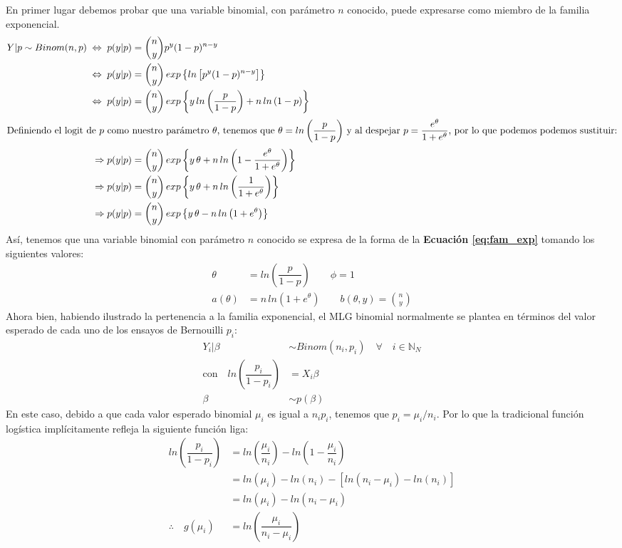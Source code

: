 En primer lugar debemos probar que una variable binomial, con parámetro $n$ conocido, puede expresarse como miembro de la familia exponencial. 
\begin{align} \label{eq:Binom_Fam_Exp}
Y|p \sim Binom(n,p) \;\Leftrightarrow\; p(y|p) &= {n\choose y}p^y(1-p)^{n-y} \nonumber \\
 \;\Leftrightarrow\; p(y|p) &= {n\choose y}\,exp\left\lbrace ln\left[p^y(1-p)^{n-y}\right]\right\rbrace \nonumber \\
 \;\Leftrightarrow\; p(y|p) &= {n\choose y}\,exp\left\lbrace y\,ln\left(\dfrac{p}{1-p}\right)+n\,ln\left(1-p\right)\right\rbrace \nonumber \\
\intertext{Definiendo el logit de $p$ como nuestro parámetro $\theta$, tenemos que $\theta = ln\left(\dfrac{p}{1-p}\right)$ y al despejar $p = \dfrac{e^\theta}{1+e^\theta}$, por lo que podemos podemos sustituir:} \nonumber
\Rightarrow p(y|p) &= {n\choose y}\,exp\left\lbrace y\,\theta+n\,ln\left(1-\dfrac{e^\theta}{1+e^\theta}\right)\right\rbrace \nonumber \\
\Rightarrow p(y|p) &= {n\choose y}\,exp\left\lbrace y\,\theta+n\,ln\left(\dfrac{1}{1+e^\theta}\right)\right\rbrace \nonumber \\
\Rightarrow p(y|p) &= {n\choose y}\,exp\left\lbrace y\,\theta-n\,ln\left(1+e^\theta\right)\right\rbrace
\end{align} 
Así, tenemos que una variable binomial con parámetro $n$ conocido se expresa de la forma de la \textbf{Ecuación \ref{eq:fam_exp}} tomando los siguientes valores: 
\begin{align*}
\theta &= ln\left(\dfrac{p}{1-p}\right) \qquad \phi = 1\\
a(\theta) &= n\,ln\left(1+e^\theta\right) \qquad b(\theta,y) = {n\choose y}
\end{align*}
Ahora bien, habiendo ilustrado la pertenencia a la familia exponencial, el MLG binomial normalmente se plantea en términos del valor esperado de cada uno de los ensayos de Bernouilli \parencite[406]{Gelman13} $p_i$:
\begin{align} \label{eq:MLG_Binom}
Y_i|\beta & \sim Binom(n_i,p_i) \quad \forall \quad i \in \mathbb{N}_N \nonumber \\
\text{con} \quad ln\left(\dfrac{p_i}{1-p_i}\right) &= X_i\beta \nonumber \\
\beta &\sim p(\beta)
\end{align}
En este caso, debido a que cada valor esperado binomial $\mu_i$ es igual a $n_ip_i$, tenemos que $p_i=\mu_i/n_i$. Por lo que la tradicional función logística implícitamente refleja la siguiente función liga: 
\begin{align*}
ln\left(\dfrac{p_i}{1-p_i}\right) &= ln\left(\dfrac{\mu_i}{n_i}\right)-ln\left(1-\dfrac{\mu_i}{n_i}\right)\\ 
&= ln\left(\mu_i\right)-ln\left(n_i\right)-\left[ln\left(n_i-\mu_i\right)-ln\left(n_i\right)\right]\\ 
&= ln\left(\mu_i\right)-ln\left(n_i-\mu_i\right)\\ 
\therefore \quad g(\mu_i)&=ln\left(\dfrac{\mu_i}{n_i-\mu_i}\right)
\end{align*}

